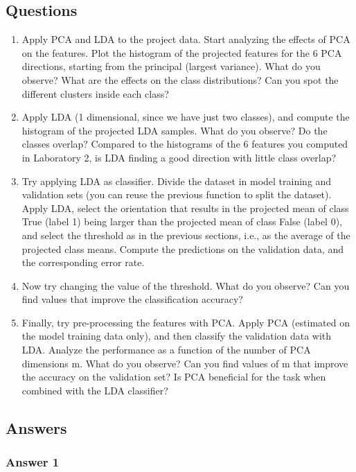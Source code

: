 \documentclass[a4paper, 12pt, english]{article}
\begin{document}
    \subsection{Questions}
    \begin{enumerate}
        \item Apply PCA and LDA to the project data. Start analyzing the effects of PCA on the features. Plot the histogram of the projected features for the 6 PCA directions, starting from the principal (largest variance). What do you observe? What are the effects on the class distributions? Can you spot the different clusters inside each class?
        \item Apply LDA (1 dimensional, since we have just two classes), and compute the histogram of the projected LDA samples. What do you observe? Do the classes overlap? Compared to the histograms of the 6 features you computed in Laboratory 2, is LDA finding a good direction with little class overlap?
        \item Try applying LDA as classifier. Divide the dataset in model training and validation sets (you can reuse the previous function to split the dataset). Apply LDA, select the orientation that results in the projected mean of class True (label 1) being larger than the projected mean of class False (label 0), and select the threshold as in the previous sections, i.e., as the average of the projected class means. Compute the predictions on the validation data, and the corresponding error rate.
        \item Now try changing the value of the threshold. What do you observe? Can you find values that improve the classification accuracy?
        \item Finally, try pre-processing the features with PCA. Apply PCA (estimated on the model training data only), and then classify the validation data with LDA. Analyze the performance as a function of the number of PCA dimensions m. What do you observe? Can you find values of m that improve the accuracy on the validation set? Is PCA beneficial for the task when combined with the LDA classifier?
    \end{enumerate}

    \subsection{Answers}

    \subsubsection{Answer 1}
\end{document}
